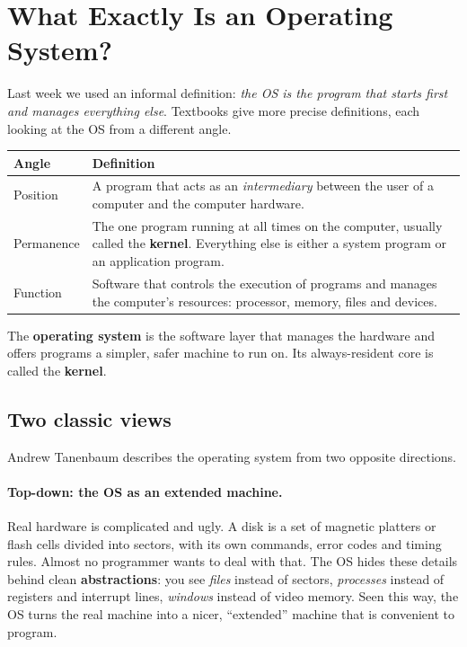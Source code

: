 \documentclass[11pt,a4paper]{article}
\newcommand{\term}[1]{\textbf{\color{mintdeep}#1}}
\begin{document}
\section{What Exactly Is an Operating System?}

Last week we used an informal definition: \emph{the OS is the program that starts first and manages everything else}. Textbooks give more precise definitions, each looking at the OS from a different angle.

\begin{center}
\renewcommand{\arraystretch}{1.35}
\begin{tabularx}{\linewidth}{>{\raggedright\arraybackslash}p{3.2cm} >{\raggedright\arraybackslash}X}
\toprule
\textbf{Angle} & \textbf{Definition} \\
\midrule
Position & A program that acts as an \emph{intermediary} between the user of a computer and the computer hardware. \\
Permanence & The one program running at all times on the computer, usually called the \term{kernel}. Everything else is either a system program or an application program. \\
Function & Software that controls the execution of programs and manages the computer's resources: processor, memory, files and devices. \\
\bottomrule
\end{tabularx}
\end{center}

\begin{keyidea}
The \textbf{operating system} is the software layer that manages the hardware and offers programs a simpler, safer machine to run on. Its always-resident core is called the \textbf{kernel}.
\end{keyidea}

\subsection{Two classic views}

Andrew Tanenbaum describes the operating system from two opposite directions.

\paragraph{Top-down: the OS as an extended machine.} Real hardware is complicated and ugly. A disk is a set of magnetic platters or flash cells divided into sectors, with its own commands, error codes and timing rules. Almost no programmer wants to deal with that. The OS hides these details behind clean \term{abstractions}: you see \emph{files} instead of sectors, \emph{processes} instead of registers and interrupt lines, \emph{windows} instead of video memory. Seen this way, the OS turns the real machine into a nicer, ``extended'' machine that is convenient to program.
\end{document}
